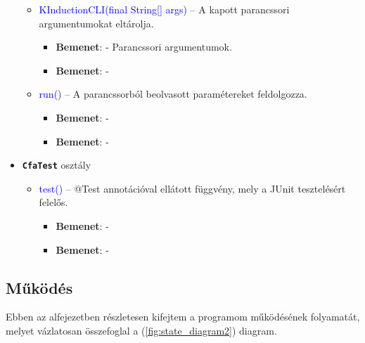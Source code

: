 \begin{itemize}
\begin{itemize}
		\item \textcolor{blue}{KInductionCLI(final String[] args)} -- A kapott parancssori argumentumokat eltárolja.
		\begin{itemize}
			\item \textbf{Bemenet}: - Parancssori argumentumok.
			\item \textbf{Bemenet}: -
		\end{itemize}
		
		\item \textcolor{blue}{run()} -- A parancssorból beolvasott paramétereket feldolgozza.
		\begin{itemize}
			\item \textbf{Bemenet}: -
			\item \textbf{Bemenet}: -
		\end{itemize}
	\end{itemize}

	\item \textbf{\texttt{CfaTest}} osztály
	\begin{itemize}
		\item \textcolor{blue}{test()} -- @Test annotációval ellátott függvény, mely a JUnit tesztelésért felelős.
		\begin{itemize}
			\item \textbf{Bemenet}: -
			\item \textbf{Bemenet}: -
		\end{itemize}
	\end{itemize}
\end{itemize}

\subsection{Működés}
Ebben az alfejezetben részletesen kifejtem a programom működésének folyamatát, melyet vázlatosan összefoglal a (\ref{fig:state_diagram2}) diagram.

